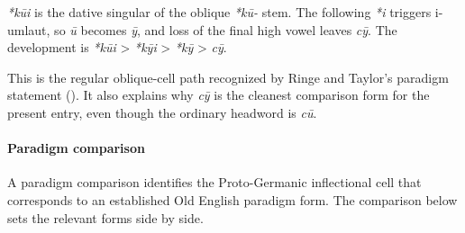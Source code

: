\documentclass[
  british,
  a4paper,
]{article}
\begin{document}
\emph{*kūi} is the dative singular of the oblique \emph{*kū-} stem. The
following \emph{*i} triggers i-umlaut, so \emph{ū} becomes \emph{ȳ}, and
loss of the final high vowel leaves \emph{cȳ}. The development is
\emph{*kūi} \textgreater{} \emph{*kȳi} \textgreater{} \emph{*kȳ}
\textgreater{} \emph{cȳ}.

This is the regular oblique-cell path recognized by Ringe and Taylor's
paradigm statement (). It also explains why \emph{cȳ} is the cleanest
comparison form for the present entry, even though the ordinary headword
is \emph{cū}.

\paragraph{Paradigm comparison}\label{paradigm-comparison-3}

A paradigm comparison identifies the Proto-Germanic inflectional cell
that corresponds to an established Old English paradigm form. The
comparison below sets the relevant forms side by side.
\end{document}
